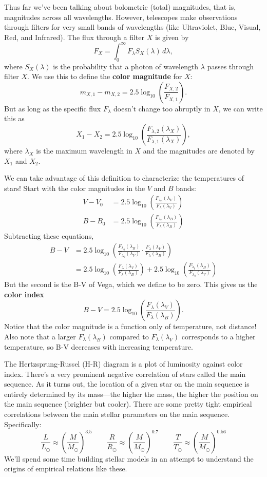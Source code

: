 \documentclass[../a062main.tex]{subfiles}
\begin{document}
Thus far we've been talking about bolometric (total) magnitudes, that is, magnitudes across all wavelengths.
However, telescopes make observations through filters for very small bands of wavelengths (like Ultraviolet, Blue, Visual, Red, and Infrared).
The flux through a filter $X$ is given by
\[ F_X = \int_{0}^{\infty} F_\lambda S_X(\lambda) \,d\lambda, \]
where $S_X(\lambda)$ is the probability that a photon of wavelength $\lambda$ passes through filter $X$.
We use this to define the \textbf{color magnitude} for $X$:
\[ m_{X,1} - m_{X,2} = 2.5 \log_{10} \left( \frac{F_{X,2}}{F_{X,1}} \right). \]
But as long as the specific flux $F_\lambda$ doesn't change too abruptly in $X$, we can write this as
\[ \boxed{X_1 - X_2 = 2.5 \log_{10} \left( \frac{F_{\lambda, 2} (\lambda_X)}{F_{\lambda, 1} (\lambda_X)} \right)}, \]
where $\lambda_X$ is the maximum wavelength in $X$ and the magnitudes are denoted by $X_1$ and $X_2$.

We can take advantage of this definition to characterize the temperatures of stars!
Start with the color magnitudes in the $V$ and $B$ bands:
\begin{align*}
    V - V_0 &= 2.5 \log_{10} \left( \frac{F_{\lambda_0} (\lambda_V)}{F_\lambda (\lambda_V)} \right) \\
    B - B_0 &= 2.5 \log_{10} \left( \frac{F_{\lambda_0} (\lambda_B)}{F_\lambda (\lambda_B)} \right)
\end{align*}
Subtracting these equations,
\begin{align*}
    B - V &= 2.5 \log_{10} \left( \frac{F_{\lambda_0} (\lambda_B)}{F_{\lambda_0} (\lambda_V)} \cdot \frac{F_{\lambda} (\lambda_V)}{F_{\lambda} (\lambda_B)} \right) \\
    &= 2.5 \log_{10} \left( \frac{F_{\lambda} (\lambda_V)}{F_{\lambda} (\lambda_B)} \right) + 2.5 \log_{10} \left( \frac{F_{\lambda_0} (\lambda_B)}{F_{\lambda_0} (\lambda_V)} \right)
\end{align*}
But the second is the B-V of Vega, which we define to be zero.
This gives us the \textbf{color index}
\[ \boxed{B - V = 2.5 \log_{10} \left( \frac{F_{\lambda} (\lambda_V)}{F_{\lambda} (\lambda_B)} \right)}. \]
Notice that the color magnitude is a function only of temperature, not distance!
Also note that a larger $F_\lambda (\lambda_B)$ compared to $F_\lambda (\lambda_V)$ corresponds to a higher temperature, so B-V decreases with increasing temperature.

The Hertzsprung-Russel (H-R) diagram is a plot of luminosity against color index.
There's a very prominent negative correlation of stars called the main sequence.
As it turns out, the location of a given star on the main sequence is entirely determined by its mass---the higher the mass, the higher the position on the main sequence (brighter but cooler).
There are some pretty tight empirical correlations between the main stellar parameters on the main sequence.
Specifically:
\[ \frac{L}{L_\odot} \approx \left( \frac{M}{M_\odot} \right)^{3.5} \qquad \frac{R}{R_\odot} \approx \left( \frac{M}{M_\odot} \right)^{0.7} \qquad \frac{T}{T_\odot} \approx \left( \frac{M}{M_\odot} \right)^{0.56} \]
We'll spend some time building stellar models in an attempt to understand the origins of empirical relations like these.

\end{document}

